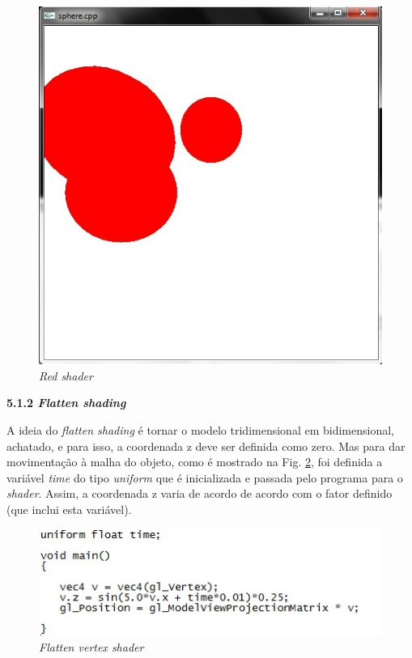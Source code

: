 \begin{description}
	\begin{figure}[h]
	\centering
		\includegraphics[keepaspectratio=true,scale=0.8]{figuras/red_shader.jpg}
	\caption{\textit{Red shader}}
	\label{red_shader}
	\end{figure}

	\item \textbf{5.1.2 \textit{Flatten shading}}

	A ideia do \textit{flatten shading} é tornar o modelo tridimensional em bidimensional, achatado, e para isso,  a coordenada z deve ser definida como zero. Mas para dar movimentação à malha do objeto, como é mostrado na Fig. \ref{flatten_vs},  foi definida a variável  \textit{time} do tipo \textit{uniform} que é inicializada e passada pelo programa para o \textit{shader}. Assim, a coordenada z varia de acordo de acordo com o fator definido (que inclui esta variável).  

	\begin{figure}[h]
	\centering
		\includegraphics[keepaspectratio=true,scale=1.0]{figuras/flatten_vs.jpg}
	\caption{\textit{Flatten vertex shader}}
	\label{flatten_vs}
	\end{figure}


\end{description}
